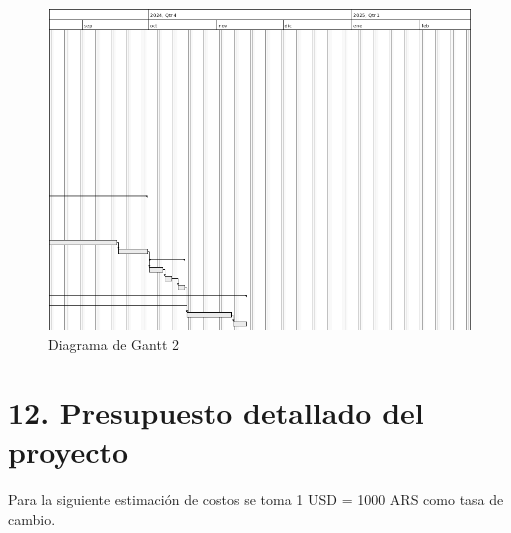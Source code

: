 \documentclass[
11pt, %
codirector, %
]{charter}
\begin{document}
\begin{figure}[htpb]
\centering 
\includegraphics[width=1\textwidth]{./Figuras/gantt-2.png}
\caption{Diagrama de Gantt 2}
\label{fig:gantt-2}
\end{figure}

\section{12. Presupuesto detallado del proyecto}
\label{sec:presupuesto}

Para la siguiente estimación de costos se toma 1 USD = 1000 ARS como tasa de cambio.
\end{document}
